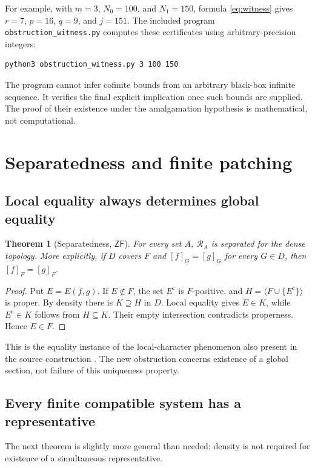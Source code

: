 \documentclass[11pt,letterpaper]{article}
\newtheorem{theorem}{Theorem}[section]
\theoremstyle{definition}
\theoremstyle{remark}
\newcommand{\RA}{\mathscr R_A}
\newcommand{\gen}[1]{\langle #1\rangle}
\newcommand{\eqset}[2]{E(#1,#2)}
\newcommand{\co}{\mathrm c}
\newcommand{\ZF}{\mathsf{ZF}}
\begin{document}
For example, with $m=3$, $N_0=100$, and $N_1=150$, formula
\eqref{eq:witness} gives $r=7$, $p=16$, $q=9$, and $j=151$.
The included program \texttt{obstruction\_witness.py} computes these
certificates using arbitrary-precision integers:
\begin{verbatim}
python3 obstruction_witness.py 3 100 150
\end{verbatim}
The program cannot infer cofinite bounds from an arbitrary black-box
infinite sequence. It verifies the final explicit implication once such
bounds are supplied. The proof of their existence under the amalgamation
hypothesis is mathematical, not computational.

\section{Separatedness and finite patching}
\label{sec:finite}

\subsection{Local equality always determines global equality}

\begin{theorem}[Separatedness, $\ZF$]\label{thm:separated}
For every set $A$, $\RA$ is separated for the dense topology. More
explicitly, if $D$ covers $F$ and $[f]_G=[g]_G$ for every $G\in D$,
then $[f]_F=[g]_F$.
\end{theorem}
\begin{proof}
Put $E=\eqset{f}{g}$. If $E\notin F$, the set $E^\co$ is
$F$-positive, and $H=\gen{F\cup\{E^\co\}}$ is proper. By density
there is $K\supseteq H$ in $D$. Local equality gives $E\in K$, while
$E^\co\in K$ follows from $H\subseteq K$. Their empty intersection
contradicts properness. Hence $E\in F$.
\end{proof}

This is the equality instance of the local-character phenomenon also
present in the source construction \cite[Lemma 5.8]{Massas2023}. The new
obstruction concerns existence of a global section, not failure of this
uniqueness property.

\subsection{Every finite compatible system has a representative}
The next theorem is slightly more general than needed: density is not
required for existence of a simultaneous representative.
\end{document}
